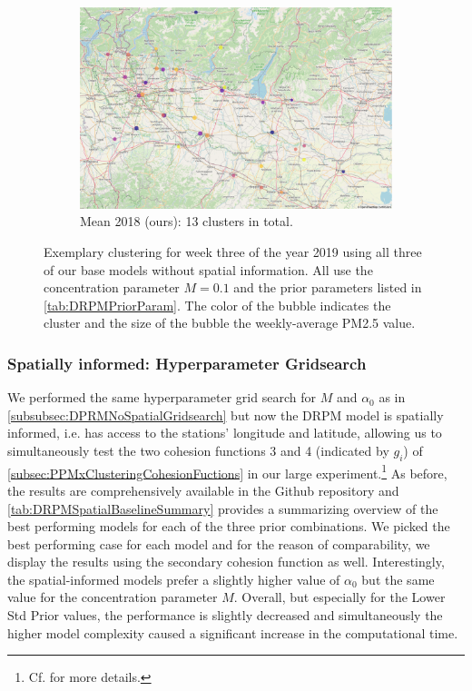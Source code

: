 \documentclass[12pt,a4paper]{article}
\begin{document}
\begin{figure}
\begin{subfigure}[b]{0.49\textwidth}
         \includegraphics[width=\textwidth]{./imgs/drpm/drpm_base_clustering_mean_prev_year.png}
         \caption{Mean 2018 (ours): 13 clusters in total.}
         \label{fig:DRPMMeanPreviousYear}
     \end{subfigure}
        \caption{Exemplary clustering for week three of the year 2019 using all three of
        our base models without spatial information. All use the concentration parameter
        $M=0.1$ and the prior parameters listed in \cref{tab:DRPMPriorParam}. The color of
        the bubble indicates the cluster and the size of the bubble the weekly-average PM2.5 value.}
        \label{fig:DRPMClusteringBaseModels}
\end{figure}

\subsubsection{Spatially informed: Hyperparameter Gridsearch}
We performed the same hyperparameter grid search for $M$ and $\alpha_0$ as in \cref{subsubsec:DPRMNoSpatialGridsearch} but now the
DRPM model is spatially informed, i.e. has access to the stations' longitude and latitude, allowing us to simultaneously 
test the two cohesion functions 3 and 4 (indicated by $g_i$) of \cref{subsec:PPMxClusteringCohesionFuctions} in our large experiment.\footnote{Cf.
\cite[Section 4.2]{Page2021-Temporal} for more details.}
As before, the results are comprehensively available in the Github repository and \cref{tab:DRPMSpatialBaselineSummary}
provides a summarizing overview of
the best performing models for each of the three prior combinations. We picked the best performing case for each model and
for the reason of comparability, we display the results using the secondary cohesion function as well. Interestingly,
the spatial-informed models prefer a slightly higher value of $\alpha_0$ but the same value for the concentration parameter
$M$. Overall, but especially for the Lower Std Prior values, the performance is slightly decreased and simultaneously
the higher model complexity caused a significant increase in the computational time.
\end{document}
